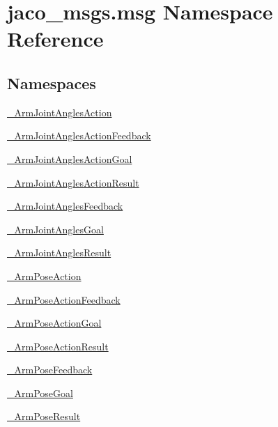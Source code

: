 \hypertarget{namespacejaco__msgs_1_1msg}{}\section{jaco\+\_\+msgs.\+msg Namespace Reference}
\label{namespacejaco__msgs_1_1msg}
\subsection*{Namespaces}
\begin{DoxyCompactItemize}
\item 
 \hyperlink{namespacejaco__msgs_1_1msg_1_1__ArmJointAnglesAction}{\+\_\+\+Arm\+Joint\+Angles\+Action}
\item 
 \hyperlink{namespacejaco__msgs_1_1msg_1_1__ArmJointAnglesActionFeedback}{\+\_\+\+Arm\+Joint\+Angles\+Action\+Feedback}
\item 
 \hyperlink{namespacejaco__msgs_1_1msg_1_1__ArmJointAnglesActionGoal}{\+\_\+\+Arm\+Joint\+Angles\+Action\+Goal}
\item 
 \hyperlink{namespacejaco__msgs_1_1msg_1_1__ArmJointAnglesActionResult}{\+\_\+\+Arm\+Joint\+Angles\+Action\+Result}
\item 
 \hyperlink{namespacejaco__msgs_1_1msg_1_1__ArmJointAnglesFeedback}{\+\_\+\+Arm\+Joint\+Angles\+Feedback}
\item 
 \hyperlink{namespacejaco__msgs_1_1msg_1_1__ArmJointAnglesGoal}{\+\_\+\+Arm\+Joint\+Angles\+Goal}
\item 
 \hyperlink{namespacejaco__msgs_1_1msg_1_1__ArmJointAnglesResult}{\+\_\+\+Arm\+Joint\+Angles\+Result}
\item 
 \hyperlink{namespacejaco__msgs_1_1msg_1_1__ArmPoseAction}{\+\_\+\+Arm\+Pose\+Action}
\item 
 \hyperlink{namespacejaco__msgs_1_1msg_1_1__ArmPoseActionFeedback}{\+\_\+\+Arm\+Pose\+Action\+Feedback}
\item 
 \hyperlink{namespacejaco__msgs_1_1msg_1_1__ArmPoseActionGoal}{\+\_\+\+Arm\+Pose\+Action\+Goal}
\item 
 \hyperlink{namespacejaco__msgs_1_1msg_1_1__ArmPoseActionResult}{\+\_\+\+Arm\+Pose\+Action\+Result}
\item 
 \hyperlink{namespacejaco__msgs_1_1msg_1_1__ArmPoseFeedback}{\+\_\+\+Arm\+Pose\+Feedback}
\item 
 \hyperlink{namespacejaco__msgs_1_1msg_1_1__ArmPoseGoal}{\+\_\+\+Arm\+Pose\+Goal}
\item 
 \hyperlink{namespacejaco__msgs_1_1msg_1_1__ArmPoseResult}{\+\_\+\+Arm\+Pose\+Result}

\end{DoxyCompactItemize}
